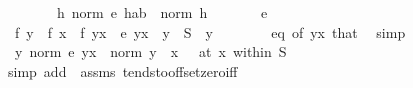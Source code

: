 \begin{isabellebody}
\ \ \ \ \ \ \ {}{\isacharcolon}{\kern0pt}\ {\isachardoublequoteopen}{\isacharparenleft}{\kern0pt}{\isasymlambda}h{\isachardot}{\kern0pt}\ norm\ {\isacharparenleft}{\kern0pt}e\ {\isacharparenleft}{\kern0pt}h{\isacharcolon}{\kern0pt}{\isacharcolon}{\kern0pt}{\isacharprime}{\kern0pt}a{\isacharparenright}{\kern0pt}{\isacharcolon}{\kern0pt}{\isacharcolon}{\kern0pt}{\isacharprime}{\kern0pt}b{\isacharparenright}{\kern0pt}\ {\isacharslash}{\kern0pt}\ norm\ h{\isacharparenright}{\kern0pt}\ {\isasymmidarrow}{}{\isasymrightarrow}\ {}{\isachardoublequoteclose}\isanewline
\ \ \ \ \ e\ \isanewline
\ \ \isamarkupfalse%
\ {\isacharminus}{\kern0pt}\isanewline
\ \ \ \ \isamarkupfalse%
\ {}{\isacharcolon}{\kern0pt}\ {\isachardoublequoteopen}f\ y\ {\isacharminus}{\kern0pt}\ f\ x\ {\isacharequal}{\kern0pt}\ f{\isacharprime}{\kern0pt}\ {\isacharparenleft}{\kern0pt}y{\isacharminus}{\kern0pt}x{\isacharparenright}{\kern0pt}\ {\isacharplus}{\kern0pt}\ e\ {\isacharparenleft}{\kern0pt}y{\isacharminus}{\kern0pt}x{\isacharparenright}{\kern0pt}{\isachardoublequoteclose}\ \ {\isachardoublequoteopen}y\ {\isasymin}\ S{\isachardoublequoteclose}\ \ y\isanewline
\ \ \ \ \ \ \isamarkupfalse%
\ eq\ {\isacharbrackleft}{\kern0pt}of\ {\isachardoublequoteopen}y{\isacharminus}{\kern0pt}x{\isachardoublequoteclose}{\isacharbrackright}{\kern0pt}\ that\ \isamarkupfalse%
\ simp\isanewline
\ \ \ \ \isamarkupfalse%
\ {}{\isacharcolon}{\kern0pt}\ {\isachardoublequoteopen}{\isacharparenleft}{\kern0pt}{\isacharparenleft}{\kern0pt}{\isasymlambda}y{\isachardot}{\kern0pt}\ norm\ {\isacharparenleft}{\kern0pt}e\ {\isacharparenleft}{\kern0pt}y{\isacharminus}{\kern0pt}x{\isacharparenright}{\kern0pt}{\isacharparenright}{\kern0pt}\ {\isacharslash}{\kern0pt}\ norm\ {\isacharparenleft}{\kern0pt}y\ {\isacharminus}{\kern0pt}\ x{\isacharparenright}{\kern0pt}{\isacharparenright}{\kern0pt}\ {\isasymlonglongrightarrow}\ {}{\isacharparenright}{\kern0pt}\ {\isacharparenleft}{\kern0pt}at\ x\ within\ S{\isacharparenright}{\kern0pt}{\isachardoublequoteclose}\isanewline
\ \ \ \ \ \ \isamarkupfalse%
\ {\isacharparenleft}{\kern0pt}simp\ add{\isacharcolon}{\kern0pt}\ {\isachardoublequoteopen}{}{\isachardoublequoteclose}\ assms\ tendsto{\isacharunderscore}{\kern0pt}offset{\isacharunderscore}{\kern0pt}zero{\isacharunderscore}{\kern0pt}iff{\isacharparenright}{\kern0pt}\isanewline
\ \ \ \ \isamarkupfalse%

\end{isabellebody}

